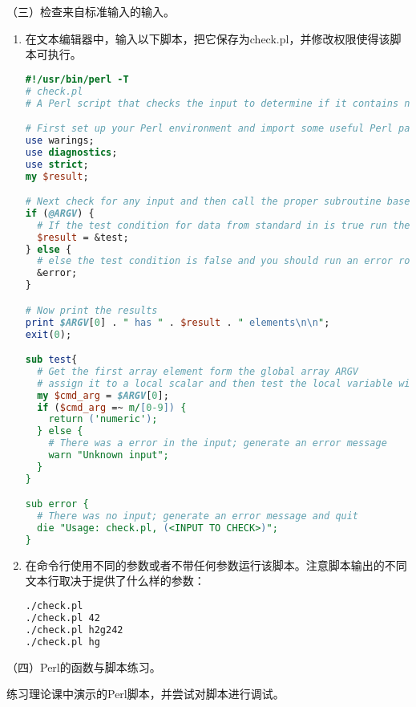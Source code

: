\vspace{0.1in}
（三）检查来自标准输入的输入。
\begin{enumerate}
  \item 在文本编辑器中，输入以下脚本，把它保存为check.pl，并修改权限使得该脚本可执行。
\begin{lstlisting}[language=perl]
#!/usr/bin/perl -T
# check.pl
# A Perl script that checks the input to determine if it contains numeric information

# First set up your Perl environment and import some useful Perl packages
use warings;
use diagnostics;
use strict;
my $result;

# Next check for any input and then call the proper subroutine based on the test
if (@ARGV) {
  # If the test condition for data from standard in is true run the test subroutine on the input data
  $result = &test;
} else {
  # else the test condition is false and you should run an error routine.
  &error;
}

# Now print the results
print $ARGV[0] . " has " . $result . " elements\n\n";
exit(0);

sub test{
  # Get the first array element form the global array ARGV
  # assign it to a local scalar and then test the local variable with a regular expression
  my $cmd_arg = $ARGV[0];
  if ($cmd_arg =~ m/[0-9]) {
    return ('numeric');
  } else {
    # There was a error in the input; generate an error message
    warn "Unknown input";
  }
}

sub error {
  # There was no input; generate an error message and quit
  die "Usage: check.pl, (<INPUT TO CHECK>)";
}
\end{lstlisting}
  \item 在命令行使用不同的参数或者不带任何参数运行该脚本。注意脚本输出的不同文本行取决于提供了什么样的参数：
\begin{lstlisting}[language=bash]
./check.pl
./check.pl 42
./check.pl h2g242
./check.pl hg
\end{lstlisting}
\end{enumerate}

\vspace{0.1in}
（四）Perl的函数与脚本练习。

练习理论课中演示的Perl脚本，并尝试对脚本进行调试。
